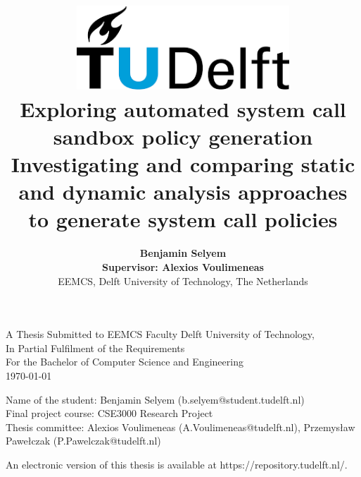 \title{
    \includegraphics[width=8cm, keepaspectratio]{tudelftlogo.png}\\
    \vspace*{2cm}
    \textbf{
        Exploring automated system call sandbox policy generation\\
        {\large Investigating and comparing static and dynamic analysis approaches to generate system call policies}
    }\\
    \vspace*{1cm}
}

\author{
    \textbf{
Benjamin Selyem}\\
    \hfill \break
    \textbf{Supervisor: Alexios Voulimeneas}\\
    \break
    {\large 
        \hfill \break
        EEMCS, Delft University of Technology, The Netherlands
    }\\
}

\date{}

\maketitle
\thispagestyle{empty}

\let\clearpagebackup\clearpage
\renewcommand{\clearpage}{ }

\onecolumn

\vspace*{1.5cm}
\begin{center}
    A Thesis Submitted to EEMCS Faculty Delft University of Technology,\\
    In Partial Fulfilment of the Requirements\\
    For the Bachelor of Computer Science and Engineering\\
    \today
\end{center}

\vspace*{2cm}

\noindent
{\small
Name of the student: Benjamin Selyem (b.selyem@student.tudelft.nl)\\
Final project course: CSE3000 Research Project\\
Thesis committee: Alexios Voulimeneas (A.Voulimeneas@tudelft.nl), Przemysław Pawełczak (P.Pawelczak@tudelft.nl)\\
}
\vfill

\begin{center}
    An electronic version of this thesis is available at https://repository.tudelft.nl/.
\end{center}

\twocolumn
\let\clearpage\clearpagebackup  
\clearpage
\setcounter{page}{1}
